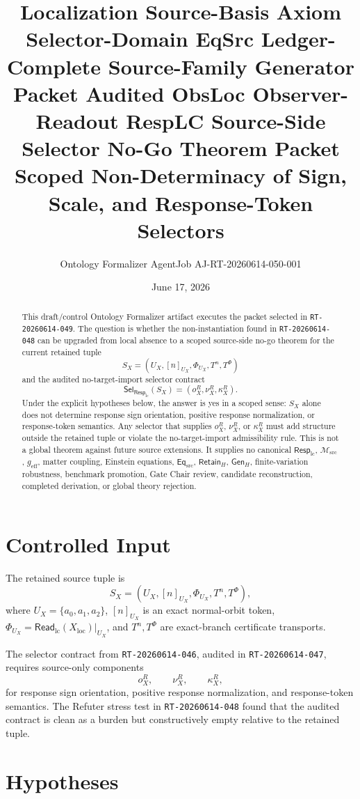 \documentclass[11pt]{article}
\title{\textbf{Localization Source-Basis Axiom Selector-Domain EqSrc Ledger-Complete Source-Family Generator Packet Audited ObsLoc Observer-Readout RespLC Source-Side Selector No-Go Theorem Packet}\\[0.35em]
\large Scoped Non-Determinacy of Sign, Scale, and Response-Token Selectors}
\author{Ontology Formalizer AgentJob AJ-RT-20260614-050-001}
\date{June 17, 2026}
\newcommand{\EqSrc}{\mathsf{Eq}_{\mathrm{src}}}
\newcommand{\ReadLC}{\mathsf{Read}_{\mathrm{lc}}}
\newcommand{\RetainH}{\mathsf{Retain}_{H}}
\newcommand{\GenH}{\mathsf{Gen}_{H}}
\newcommand{\Msrc}{\mathcal{M}_{\mathrm{src}}}
\newcommand{\RespLC}{\mathsf{Resp}_{\mathrm{lc}}}
\newcommand{\SelResp}{\mathsf{Sel}_{\RespLC}}
\newcommand{\geff}{g_{\mathrm{eff}}}
\begin{document}
\maketitle

\begin{abstract}
This draft/control Ontology Formalizer artifact executes the packet
selected in \texttt{RT-20260614-049}. The question is whether the
non-instantiation found in \texttt{RT-20260614-048} can be upgraded
from local absence to a scoped source-side no-go theorem for the
current retained tuple
\[
    S_X=(U_X,[n]_{U_X},\Phi_{U_X},T^n,T^\Phi)
\]
and the audited no-target-import selector contract
\[
    \SelResp(S_X)=(o^R_X,\nu^R_X,\kappa^R_X).
\]
Under the explicit hypotheses below, the answer is yes in a scoped
sense: \(S_X\) alone does not determine response sign orientation,
positive response normalization, or response-token semantics. Any
selector that supplies \(o^R_X\), \(\nu^R_X\), or \(\kappa^R_X\)
must add structure outside the retained tuple or violate the
no-target-import admissibility rule. This is not a global theorem
against future source extensions. It supplies no canonical
\(\RespLC\), \(\Msrc\), \(\geff\), matter coupling, Einstein
equations, \(\EqSrc\), \(\RetainH\), \(\GenH\), finite-variation
robustness, benchmark promotion, Gate Chair review, candidate
reconstruction, completed derivation, or global theory rejection.
\end{abstract}

\section{Controlled Input}

The retained source tuple is
\[
    S_X=(U_X,[n]_{U_X},\Phi_{U_X},T^n,T^\Phi),
\]
where \(U_X=\{a_0,a_1,a_2\}\), \([n]_{U_X}\) is an exact
normal-orbit token, \(\Phi_{U_X}=\ReadLC(X_{\mathrm{loc}})|_{U_X}\),
and \(T^n,T^\Phi\) are exact-branch certificate transports.

The selector contract from \texttt{RT-20260614-046}, audited in
\texttt{RT-20260614-047}, requires source-only components
\[
    o^R_X,\qquad \nu^R_X,\qquad \kappa^R_X,
\]
for response sign orientation, positive response normalization, and
response-token semantics. The Refuter stress test in
\texttt{RT-20260614-048} found that the audited contract is clean as a
burden but constructively empty relative to the retained tuple.

\section{Hypotheses}
\end{document}
